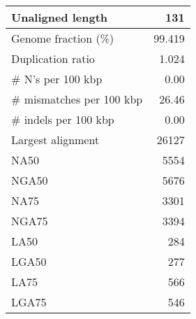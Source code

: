 \documentclass[12pt,a4paper]{article}
\begin{document}
\begin{table}[ht]
\begin{center}
\begin{tabular}{|l*{1}{|r}|}
Unaligned length & 131 \\ \hline
Genome fraction (\%) & 99.419 \\ \hline
Duplication ratio & 1.024 \\ \hline
\# N's per 100 kbp & 0.00 \\ \hline
\# mismatches per 100 kbp & 26.46 \\ \hline
\# indels per 100 kbp & 0.00 \\ \hline
Largest alignment & 26127 \\ \hline
NA50 & 5554 \\ \hline
NGA50 & 5676 \\ \hline
NA75 & 3301 \\ \hline
NGA75 & 3394 \\ \hline
LA50 & 284 \\ \hline
LGA50 & 277 \\ \hline
LA75 & 566 \\ \hline
LGA75 & 546 \\ \hline
\end{tabular}
\end{center}
\end{table}
\end{document}

